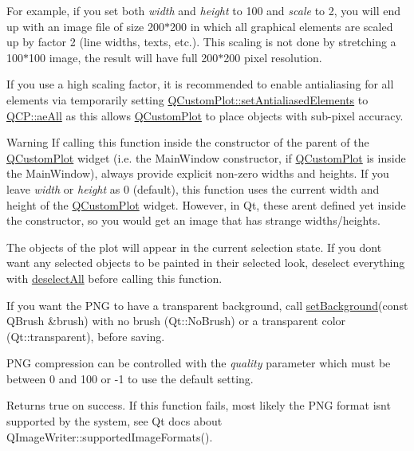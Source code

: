 For example, if you set both {\itshape width} and {\itshape height} to 100 and {\itshape scale} to 2, you will end up with an image file of size 200$\ast$200 in which all graphical elements are scaled up by factor 2 (line widths, texts, etc.). This scaling is not done by stretching a 100$\ast$100 image, the result will have full 200$\ast$200 pixel resolution.

If you use a high scaling factor, it is recommended to enable antialiasing for all elements via temporarily setting \hyperlink{class_q_custom_plot_af6f91e5eab1be85f67c556e98c3745e8}{Q\+Custom\+Plot\+::set\+Antialiased\+Elements} to \hyperlink{namespace_q_c_p_ae55dbe315d41fe80f29ba88100843a0caa897c232a0ffc8368e7c100ffc59ef31}{Q\+C\+P\+::ae\+All} as this allows \hyperlink{class_q_custom_plot}{Q\+Custom\+Plot} to place objects with sub-\/pixel accuracy.

\begin{DoxyWarning}{Warning}
If calling this function inside the constructor of the parent of the \hyperlink{class_q_custom_plot}{Q\+Custom\+Plot} widget (i.\+e. the Main\+Window constructor, if \hyperlink{class_q_custom_plot}{Q\+Custom\+Plot} is inside the Main\+Window), always provide explicit non-\/zero widths and heights. If you leave {\itshape width} or {\itshape height} as 0 (default), this function uses the current width and height of the \hyperlink{class_q_custom_plot}{Q\+Custom\+Plot} widget. However, in Qt, these aren\textquotesingle{}t defined yet inside the constructor, so you would get an image that has strange widths/heights.
\end{DoxyWarning}
The objects of the plot will appear in the current selection state. If you don\textquotesingle{}t want any selected objects to be painted in their selected look, deselect everything with \hyperlink{class_q_custom_plot_a9d4808ab925b003054085246c92a257c}{deselect\+All} before calling this function.

If you want the P\+N\+G to have a transparent background, call \hyperlink{class_q_custom_plot_a130358592cfca353ff3cf5571b49fb00}{set\+Background}(const Q\+Brush \&brush) with no brush (Qt\+::\+No\+Brush) or a transparent color (Qt\+::transparent), before saving.

P\+N\+G compression can be controlled with the {\itshape quality} parameter which must be between 0 and 100 or -\/1 to use the default setting.

Returns true on success. If this function fails, most likely the P\+N\+G format isn\textquotesingle{}t supported by the system, see Qt docs about Q\+Image\+Writer\+::supported\+Image\+Formats().

